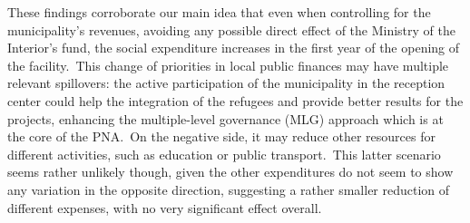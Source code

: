 \documentclass[authoryear,preprint,review,12pt]{elsarticle}
\begin{document}
\noindent
These findings corroborate our main idea that even when controlling for the municipality's revenues, avoiding any possible direct effect of the Ministry of the Interior's fund, the social expenditure increases in the first year of the opening of the facility.\ This change of priorities in local public finances may have multiple relevant spillovers: the active participation of the municipality in the reception center could help the integration of the refugees and provide better results for the projects, enhancing the multiple-level governance (MLG) approach which is at the core of the PNA.\ On the negative side, it may reduce other resources for different activities, such as education or public transport.\ This latter scenario seems rather unlikely though, given the other expenditures do not seem to show any variation in the opposite direction, suggesting a rather smaller reduction of different expenses, with no very significant effect overall.\\
\end{document}
